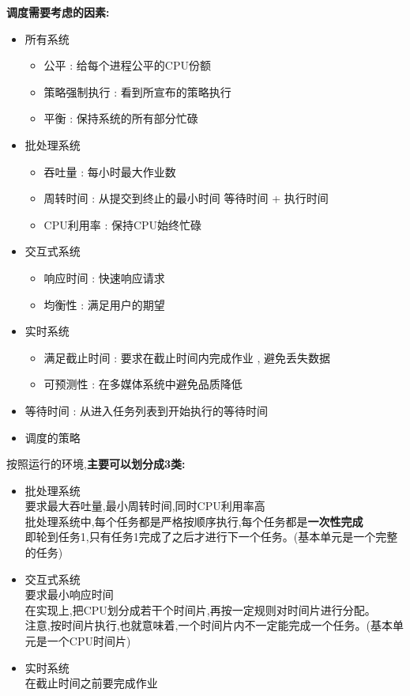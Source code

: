 \documentclass[UTF8,a4paper]{ctexart}
\newcommand{\spaceline}{\vspace{\baselineskip}}
\begin{document}
\spaceline
\textbf{调度需要考虑的因素:}
\begin{itemize}
	\item 所有系统
	      \begin{itemize}
		      \item 公平 : 给每个进程公平的CPU份额
		      \item 策略强制执行 : 看到所宣布的策略执行
		      \item 平衡 : 保持系统的所有部分忙碌
	      \end{itemize}
	\item 批处理系统
	      \begin{itemize}
		      \item 吞吐量 : 每小时最大作业数
		      \item 周转时间 : 从提交到终止的最小时间 等待时间 + 执行时间
		      \item CPU利用率 : 保持CPU始终忙碌
	      \end{itemize}
	\item 交互式系统
	      \begin{itemize}
		      \item 响应时间 : 快速响应请求
		      \item 均衡性 : 满足用户的期望
	      \end{itemize}

	\item 实时系统
	      \begin{itemize}
		      \item 满足截止时间 : 要求在截止时间内完成作业 , 避免丢失数据
		      \item 可预测性 : 在多媒体系统中避免品质降低
	      \end{itemize}

	\item 等待时间 : 从进入任务列表到开始执行的等待时间

	\item 调度的策略
\end{itemize}

\spaceline
按照运行的环境,\textbf{主要可以划分成3类:}
\begin{itemize}
	\item 批处理系统\\
	      要求最大吞吐量,最小周转时间,同时CPU利用率高\\
	      批处理系统中,每个任务都是严格按顺序执行,每个任务都是\textbf{一次性完成}\\
	      即轮到任务1,只有任务1完成了之后才进行下一个任务。(基本单元是一个完整的任务)
	\item 交互式系统\\
	      要求最小响应时间\\
	      在实现上,把CPU划分成若干个时间片,再按一定规则对时间片进行分配。\\
	      注意,按时间片执行,也就意味着,一个时间片内不一定能完成一个任务。(基本单元是一个CPU时间片)
	\item 实时系统\\
	      在截止时间之前要完成作业
\end{itemize}
\end{document}
